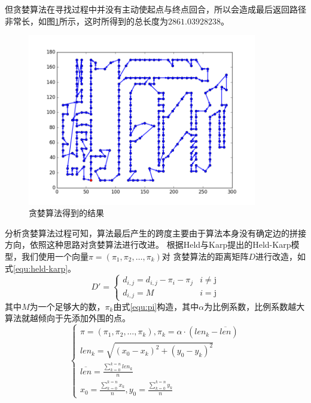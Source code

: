 \documentclass[fontset=windows,a4paper,12pt]{ctexart}
\begin{document}
         但贪婪算法在寻找过程中并没有主动使起点与终点回合，所以会造成最后返回路径非常长，如图\ref{fig:fail}所示，这时所得到的总长度为$2861.03928238$。
         \begin{figure}[htbp]
            \centering
            \includegraphics[width=10cm]{pic/greedy_fail.png}
            \caption{贪婪算法得到的结果}
            \label{fig:fail}
        \end{figure}
        分析贪婪算法过程可知，算法最后产生的跨度主要由于算法本身没有确定边的拼接方向，依照这种思路对贪婪算法进行改进。
        根据Held与Karp提出的Held-Karp模型\cite{held1970traveling}，我们使用一个向量$\pi=(\pi_1,\pi_2,\dots,\pi_k)$对
        贪婪算法的距离矩阵$D$进行改造，如式\ref{equ:held-karp}。
        \begin{equation}
	        D'=\left\{
		        \begin{array}{ll}
		        	d_{i,j} = d_{i,j} - \pi_i - \pi_j & \textrm{$i \neq $j}\\
		        	d_{i,j} = M & \textrm{$i=$j}
		        \end{array}
	        \right.
	        \label{equ:held-karp}
        \end{equation}
        其中$M$为一个足够大的数，$\pi_k$由式\ref{equ:pi}构造，其中$\alpha$为比例系数，比例系数越大算法就越倾向于先添加外围的点。
        \begin{equation}
             \left\{
	             \begin{array}{l}
		             \pi=(\pi_1,\pi_2,\dots{,\pi_k}),\pi_k=\alpha\cdot(len_k-\overline{len})\\
		             len_k = \sqrt{(x_0-x_k)^2+(y_0-y_k)^2}\\
		             \overline{len} = \frac{\sum_{k=0}^{k=n}len_k}{n}\\
		             x_0 = \frac{\sum_{k=0}^{k=n}x_k}{n},y_0 = \frac{\sum_{k=0}^{k=n}y_k}{n}
	             \end{array}
             \right.
             \label{equ:pi}
        \end{equation}
\end{document}
